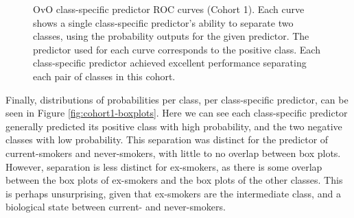 \documentclass{article} %
\begin{document}
\begin{figure}[p]
\begin{subfigure}{0.46\linewidth}
    \end{subfigure}
    \caption[Class-specific predictor ROC curves (Cohort 1)]{OvO class-specific predictor ROC curves (Cohort 1). Each curve shows a single class-specific predictor's ability to separate two classes, using the probability outputs for the given predictor. The predictor used for each curve corresponds to the positive class. Each class-specific predictor achieved excellent performance separating each pair of classes in this cohort.}
    \label{fig:cohort1-initial-rocs}
\end{figure}

Finally, distributions of probabilities per class, per class-specific predictor, can be seen in Figure \ref{fig:cohort1-boxplots}. Here we can see each class-specific predictor generally predicted its positive class with high probability, and the two negative classes with low probability. This separation was distinct for the predictor of current-smokers and never-smokers, with little to no overlap between box plots. However, separation is less distinct for ex-smokers, as there is some overlap between the box plots of ex-smokers and the box plots of the other classes. This is perhaps unsurprising, given that ex-smokers are the intermediate class, and a biological state between current- and never-smokers.
\end{document}
